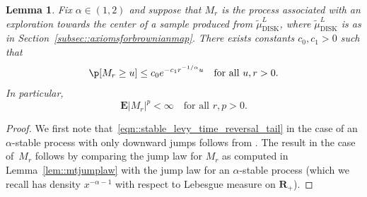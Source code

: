 \documentclass[JEP,XML,SOM,Unicode]{cedram}
\theoremstyle{plain}
\numberwithin{theorem}{section}
\newtheorem{lemma}[theorem]{Lemma}
\theoremstyle{definition}
\newcommand \E {{\mathbf E}}
\newcommand{\R}{\mathbf{R}}
\newcommand{\tmudl}{\wt{\mu}_{\mathrm{DISK}}^L}
\let\wt\widetilde
\begin{document}
\begin{lemma}
\label{lem::stable_levy_time_reversal}
Fix $\alpha \in (1,2)$ and suppose that $M_r$ is the process associated with an exploration towards the center of a sample produced from $\tmudl$, where $\tmudl$ is as in Section~\ref{subsec::axiomsforbrownianmap}. There exists constants $c_0,c_1 > 0$ such that
\begin{equation}
\label{eqn::stable_levy_time_reversal_tail}
\p[ M_r \geq u ] \leq c_0 e^{-c_1 r^{-1/\alpha} u} \quad\text{for all } u,r > 0.
\end{equation}
In particular,
\begin{equation}
\label{eqn::stable_levy_time_reversal_moment}
\E |M_r|^p < \infty \quad\text{for all } r,p > 0.
\end{equation}
\end{lemma}
\begin{proof}
We first note that~\eqref{eqn::stable_levy_time_reversal_tail} in the case of an $\alpha$-stable process with only downward jumps follows from \cite[Chap.\,VII, Cor.\,2]{bertoinlevybook}. The result in the case of~$M_r$ follows by comparing the jump law for $M_r$ as computed in Lemma~\ref{lem::mtjumplaw} with the jump law for an $\alpha$-stable process (which we recall has density $x^{-\alpha-1}$ with respect to Lebesgue measure on $\R_+$).
\end{proof}
\end{document}
